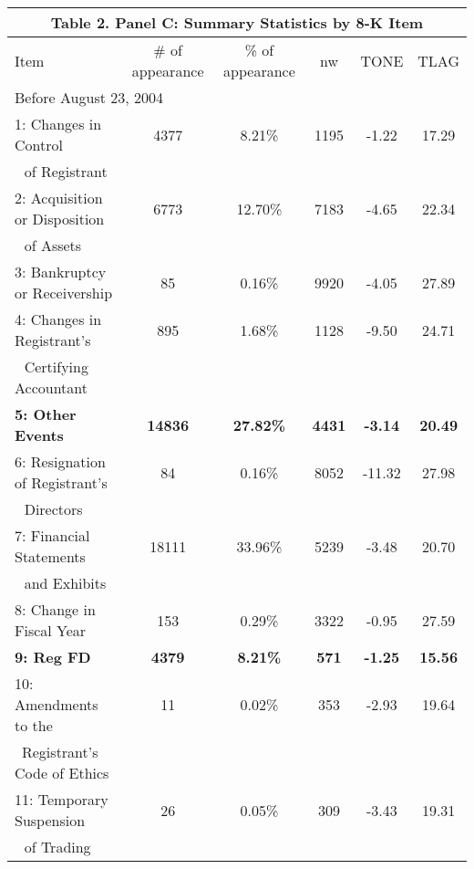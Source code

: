 \begin{table}[H]   \label{T2PC}%
  \begin{center}
  	\begin{tabular}{lccccc}
  		\multicolumn{6}{c}{\textbf{Table 2. Panel C: Summary Statistics by 8-K Item}} \\
  		\midrule
  		\midrule
  		Item & \multicolumn{1}{c}{\# of appearance} & \multicolumn{1}{c}{\% of appearance} & \multicolumn{1}{c}{nw} & \multicolumn{1}{c}{TONE} & \multicolumn{1}{c}{TLAG} \\
  		\midrule
  		\multicolumn{6}{l}{Before August 23, 2004} \\
  		\midrule
  		1: Changes in Control & 4377 & 8.21\% & 1195 & -1.22 & 17.29 \\
  		\: \,\, of Registrant & &  &  &  & \\
  		2: Acquisition or Disposition & 6773 & 12.70\% & 7183 & -4.65 & 22.34 \\
  		\: \,\, of Assets & &  &  &  & \\
  		3: Bankruptcy or Receivership & 85 & 0.16\% & 9920 & -4.05 & 27.89 \\
  		4: Changes in Registrant's & 895 & 1.68\% & 1128 & -9.50 & 24.71 \\
  		\: \,\, Certifying Accountant & &  &  &  & \\
  		\textbf{5: Other Events} & \textbf{14836} & \textbf{27.82\%} & \textbf{4431} & \textbf{-3.14} & \textbf{20.49} \\
  		6: Resignation of Registrant's & 84 & 0.16\% & 8052 & -11.32 & 27.98 \\
  		\: \,\, Directors & &  &  &  & \\
  		7: Financial Statements & 18111 & 33.96\% & 5239 & -3.48 & 20.70 \\
  		\: \,\, and Exhibits & &  &  &  & \\
  		8: Change in Fiscal Year & 153 & 0.29\% & 3322 & -0.95 & 27.59 \\
  		\textbf{9: Reg FD} & \textbf{4379} & \textbf{8.21\%} & \textbf{571} & \textbf{-1.25} & \textbf{15.56} \\
  		10: Amendments to the & 11 & 0.02\% & 353 & -2.93 & 19.64 \\
  		\quad\:\, Registrant's Code of Ethics & &  &  &  & \\
  		11: Temporary Suspension & 26 & 0.05\% & 309 & -3.43 & 19.31 \\
  		\: \,\, of Trading & &  &  &  & \\

\end{tabular}
\end{center}
\end{table}
